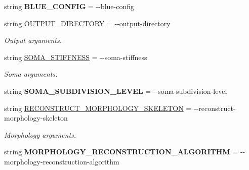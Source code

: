 \begin{DoxyCompactItemize}
\item 
string {\bfseries B\+L\+U\+E\+\_\+\+C\+O\+N\+F\+IG} = \textquotesingle{}-\/-\/blue-\/config\textquotesingle{}\hypertarget{classmeshy_1_1neuromorphovis_1_1interface_1_1cli_1_1args_1_1Args_a053d4fca913b8381ed7acf6c52272b09}{}\label{classmeshy_1_1neuromorphovis_1_1interface_1_1cli_1_1args_1_1Args_a053d4fca913b8381ed7acf6c52272b09}

\item 
string \hyperlink{classmeshy_1_1neuromorphovis_1_1interface_1_1cli_1_1args_1_1Args_a6b9581e627cd23cd543604b33439f4e6}{O\+U\+T\+P\+U\+T\+\_\+\+D\+I\+R\+E\+C\+T\+O\+RY} = \textquotesingle{}-\/-\/output-\/directory\textquotesingle{}
\begin{DoxyCompactList}\small\item\em Output arguments. \end{DoxyCompactList}\item 
string \hyperlink{classmeshy_1_1neuromorphovis_1_1interface_1_1cli_1_1args_1_1Args_a324ec9c253af1991226b57b7fc508dfb}{S\+O\+M\+A\+\_\+\+S\+T\+I\+F\+F\+N\+E\+SS} = \textquotesingle{}-\/-\/soma-\/stiffness\textquotesingle{}
\begin{DoxyCompactList}\small\item\em Soma arguments. \end{DoxyCompactList}\item 
string {\bfseries S\+O\+M\+A\+\_\+\+S\+U\+B\+D\+I\+V\+I\+S\+I\+O\+N\+\_\+\+L\+E\+V\+EL} = \textquotesingle{}-\/-\/soma-\/subdivision-\/level\textquotesingle{}\hypertarget{classmeshy_1_1neuromorphovis_1_1interface_1_1cli_1_1args_1_1Args_a70d67f6eb44d5bbad37a8514ba16f1b4}{}\label{classmeshy_1_1neuromorphovis_1_1interface_1_1cli_1_1args_1_1Args_a70d67f6eb44d5bbad37a8514ba16f1b4}

\item 
string \hyperlink{classmeshy_1_1neuromorphovis_1_1interface_1_1cli_1_1args_1_1Args_ada3a045bb135e51edb710206d85f5047}{R\+E\+C\+O\+N\+S\+T\+R\+U\+C\+T\+\_\+\+M\+O\+R\+P\+H\+O\+L\+O\+G\+Y\+\_\+\+S\+K\+E\+L\+E\+T\+ON} = \textquotesingle{}-\/-\/reconstruct-\/morphology-\/skeleton\textquotesingle{}
\begin{DoxyCompactList}\small\item\em Morphology arguments. \end{DoxyCompactList}\item 
string {\bfseries M\+O\+R\+P\+H\+O\+L\+O\+G\+Y\+\_\+\+R\+E\+C\+O\+N\+S\+T\+R\+U\+C\+T\+I\+O\+N\+\_\+\+A\+L\+G\+O\+R\+I\+T\+HM} = \textquotesingle{}-\/-\/morphology-\/reconstruction-\/algorithm\textquotesingle{}\hypertarget{classmeshy_1_1neuromorphovis_1_1interface_1_1cli_1_1args_1_1Args_a931fdc4a110ef7047795fc28cefca04b}{}\label{classmeshy_1_1neuromorphovis_1_1interface_1_1cli_1_1args_1_1Args_a931fdc4a110ef7047795fc28cefca04b}


\end{DoxyCompactItemize}
